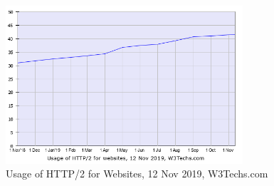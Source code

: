 \begin{figure}[H] \label{web using h2}
    \centering
    \includegraphics[width=88mm,scale=0.8]{Apdenix/HTTP2SITESgraph.png}
    \caption{Usage of HTTP/2 for Websites, 12 Nov 2019, W3Techs.com}
    \label{web http2}
\end{figure}
